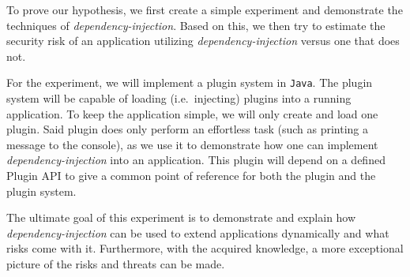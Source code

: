 To prove our hypothesis, we first create a simple experiment and demonstrate the techniques of \textit{dependency-injection}.
Based on this, we then try to estimate the security risk of an application utilizing \textit{dependency-injection} versus one that does not.

For the experiment, we will implement a plugin system in \texttt{Java}.
The plugin system will be capable of loading (i.e.~injecting) plugins into a running application.
To keep the application simple, we will only create and load one plugin.
Said plugin does only perform an effortless task (such as printing a message to the console), as we use it to demonstrate how one can implement \textit{dependency-injection} into an application.
This plugin will depend on a defined Plugin API to give a common point of reference for both the plugin and the plugin system.

The ultimate goal of this experiment is to demonstrate and explain how \textit{dependency-injection} can be used to extend applications dynamically and what risks come with it.
Furthermore, with the acquired knowledge, a more exceptional picture of the risks and threats can be made.


